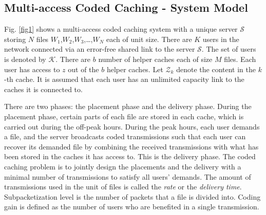 \documentclass[conference]{IEEEtran}
\begin{document}
	\subsection{Multi-access Coded Caching - System Model}
	\label{sec1A}
	Fig. \ref{fig1} shows a multi-access coded caching system with a unique server $\mathcal{S}$ storing $N$ files $W_{1}$,$W_{2}$,$W_{3}$,\dots,$W_{N}$ each of unit size. There are $K$ users in the network connected via an error-free shared link to the server $\mathcal{S}.$ The set of users is denoted by $\mathcal{K}.$  There are $b$ number of helper caches each of size $M$ files. Each user has access to $z$ out of the $b$ helper caches. Let $\mathcal{Z}_k$ denote the content in the $k$-th cache. It is assumed that each user has an unlimited capacity link to the caches it is connected to. 
	
	There are two phases: the placement phase and the delivery phase. During the placement phase, certain parts of each file are stored in each cache, which is carried out during the off-peak hours. During the peak hours, each user demands a file, and the server broadcasts coded transmissions such that each user can recover its demanded file by combining the received transmissions with what has been stored in the caches it has access to. This is the delivery phase. The coded caching problem is to jointly design the placements and the delivery with a minimal number of transmissions to satisfy all users' demands. The amount of transmissions used in the unit of files is called the {\it rate} or the {\it delivery time}. Subpacketization level is the number of packets that a file is divided into. Coding gain is defined as the number of users who are benefited in a single transmission. 
\end{document}
